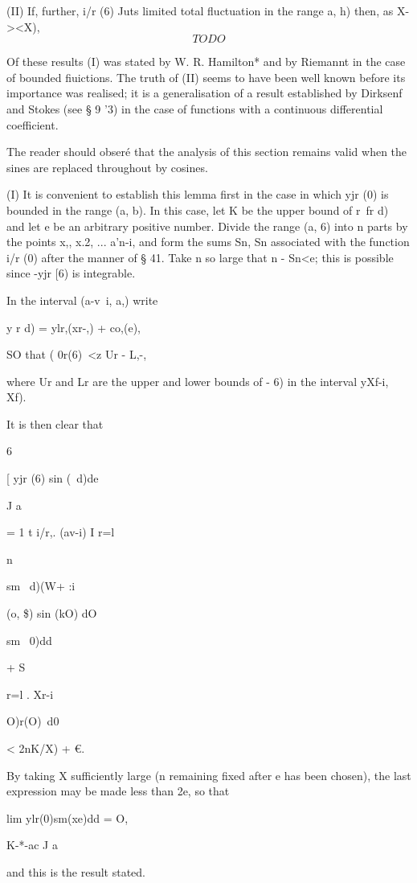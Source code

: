 (II) If, further, i/r (6) Juts limited total fluctuation in the range
a, h) then, as X-><X),
$$
TODO
$$

%
%

Of these results (I) was stated by W. R. Hamilton* and by Riemannt in
the case of bounded fiuictions. The truth of (II) seems to have been
well known before its importance was realised; it is a generalisation
of a result established by Dirksenf and Stokes (see § 9 '3) in the
case of functions with a continuous differential coefficient.

The reader should obser\'e that the analysis of this section remains
valid when the sines are replaced throughout by cosines.

(I) It is convenient to establish this lemma first in the case in
which yjr (0) is bounded in the range (a, b). In this case, let K be
the upper bound of r\ fr d)\, and let e be an arbitrary positive
number. Divide the range (a, 6) into n parts by the points x,, x.2,
... a'n-i, and form the sums Sn, Sn associated with the function i/r
(0) after the manner of § 41. Take n so large that n - Sn<e; this is
possible since -yjr [6) is integrable.

In the interval (a-v\ i, a,) write

y r d) = ylr,(xr-,) + co,(e),

SO that ( 0r(6)\ <z Ur - L,-,

where Ur and Lr are the upper and lower bounds of - 6) in the interval
yXf-i, Xf).

It is then clear that

6

[ yjr (6) sin (\ d)de

J a

= 1 t i/r,. (av-i) I r=l

n

sm \ d)(W+ :i

(o, \$) sin (kO) dO

sm \ 0)dd

+ S

r=l . Xr-i

O)r(O)\ d0

< 2nK/X) + €.

By taking X sufficiently large (n remaining fixed after e has been
chosen), the last expression may be made less than 2e, so that

lim ylr(0)sm(xe)dd = O,

K-*-ac J a

and this is the result stated.

